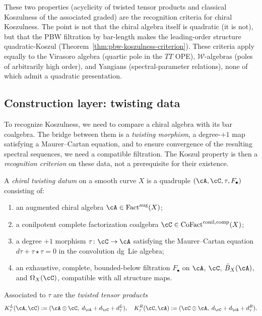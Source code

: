 These two properties (acyclicity of twisted tensor products and
classical Koszulness of the associated graded) are the
recognition criteria for chiral Koszulness. The point is not that
the chiral algebra itself is quadratic (it is not), but that the PBW
filtration by bar-length makes the leading-order structure
quadratic-Koszul (Theorem~\ref{thm:pbw-koszulness-criterion}).
These criteria apply equally to
the Virasoro algebra (quartic pole in the $TT$ OPE),
$\mathcal{W}$-algebras (poles of arbitrarily high order),
and Yangians (spectral-parameter relations), none of which
admit a quadratic presentation.

\subsection{Construction layer: twisting data}

To recognize Koszulness, we need to compare a chiral algebra with
its bar coalgebra. The bridge between them is a \emph{twisting morphism},
a degree-$+1$ map satisfying a Maurer--Cartan equation, and
to ensure convergence of the resulting spectral sequences, we need a
compatible filtration. The Koszul property is then a
\emph{recognition criterion} on these data, not a prerequisite for
their existence.

\begin{definition}\label{def:chiral-twisting-datum}
A \emph{chiral twisting datum} on a smooth curve $X$ is a quadruple
$(\cA, \cC, \tau, F_\bullet)$ consisting of:
\begin{enumerate}
\item an augmented chiral algebra
 $\cA \in \operatorname{Fact}^{\mathrm{aug}}(X)$;
\item a conilpotent complete factorization coalgebra
 $\cC \in \operatorname{CoFact}^{\mathrm{conil,comp}}(X)$;
\item a degree $+1$ morphism
 $\tau\colon \cC \to \cA$ satisfying the Maurer--Cartan equation
 $d\tau + \tau \star \tau = 0$ in the convolution dg~Lie algebra;
\item an exhaustive, complete, bounded-below filtration $F_\bullet$ on $\cA$,
 $\cC$, $\bar{B}_X(\cA)$, and $\Omega_X(\cC)$, compatible with
 all structure maps.
\end{enumerate}
Associated to $\tau$ are the \emph{twisted tensor products}
\[
K_\tau^L(\cA,\cC) := (\cA \otimes \cC,\; d_\cA + d_\cC + d_\tau^L),
\quad
K_\tau^R(\cC,\cA) := (\cC \otimes \cA,\; d_\cC + d_\cA + d_\tau^R).
\]
\end{definition}

